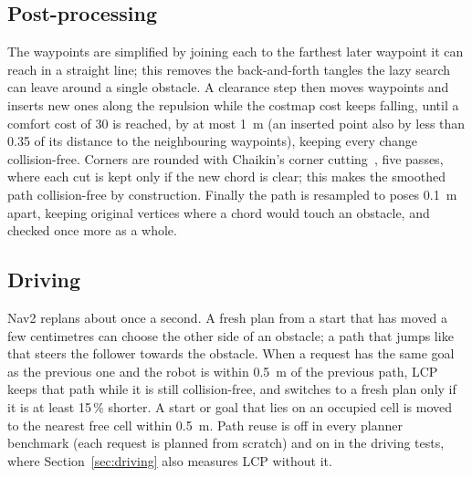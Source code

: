 \documentclass[conference]{IEEEtran}
\newcommand{\lcp}{LCP}
\begin{document}
\subsection{Post-processing}
\label{sec:post}

The waypoints are simplified by joining each to the farthest later waypoint it can
reach in a straight line; this removes the back-and-forth tangles the lazy search
can leave around a single obstacle. A clearance step then moves waypoints and
inserts new ones along the repulsion while the costmap cost keeps falling, until
a comfort cost of 30 is reached, by at most \SI{1}{m} (an inserted point also by
less than 0.35 of its distance to the neighbouring waypoints), keeping every
change collision-free. Corners are rounded
with Chaikin's corner cutting~\cite{chaikin1974algorithm}, five passes, where each
cut is kept only if the new chord is clear; this makes the smoothed path
collision-free by construction. Finally the path is resampled to poses
\SI{0.1}{m} apart, keeping original vertices where a chord would touch an
obstacle, and checked once more as a whole.

\subsection{Driving}
\label{sec:drivemethod}

Nav2 replans about once a second. A fresh plan from a start that has moved a few
centimetres can choose the other side of an obstacle; a path that jumps like that
steers the follower towards the obstacle. When a request has the same goal as the
previous one and the robot is within \SI{0.5}{m} of the previous path, \lcp{}
keeps that path while it is still collision-free, and switches to a fresh plan
only if it is at least 15\,\% shorter. A start or goal that lies on an occupied
cell is moved to the nearest free cell within \SI{0.5}{m}. Path reuse is off in
every planner benchmark (each request is planned from scratch) and on in the
driving tests, where Section~\ref{sec:driving} also measures \lcp{} without it.
\end{document}
